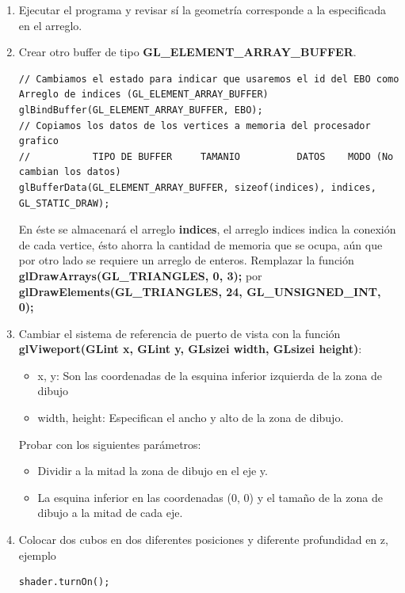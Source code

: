 \documentclass[11pt, english]{article}
\begin{document}
\begin{enumerate}
\item Ejecutar el programa y revisar sí la geometría corresponde a la especificada en el arreglo.

\item Crear otro buffer de tipo \textbf{GL\_ELEMENT\_ARRAY\_BUFFER}.
\begin{lstlisting}[label={list:second},caption={Ejemplo para crear un arreglo de indices.}, style=customc]
// Cambiamos el estado para indicar que usaremos el id del EBO como Arreglo de indices (GL_ELEMENT_ARRAY_BUFFER)
glBindBuffer(GL_ELEMENT_ARRAY_BUFFER, EBO);
// Copiamos los datos de los vertices a memoria del procesador grafico
//           TIPO DE BUFFER     TAMANIO          DATOS    MODO (No cambian los datos)
glBufferData(GL_ELEMENT_ARRAY_BUFFER, sizeof(indices), indices, GL_STATIC_DRAW);
\end{lstlisting}

 En éste se almacenará el arreglo \textbf{indices}, el arreglo indices indica la conexión de cada vertice, ésto ahorra la cantidad de memoria que se ocupa, aún que por otro lado se requiere un arreglo de enteros. Remplazar la función \textbf{glDrawArrays(GL\_TRIANGLES, 0, 3);} por \textbf{glDrawElements(GL\_TRIANGLES, 24, GL\_UNSIGNED\_INT, 0);}

\item Cambiar el sistema de referencia de puerto de vista con la función \textbf{glViweport(GLint x, GLint y, GLsizei width, GLsizei height)}:
\begin{itemize}
\item x, y: Son las coordenadas de la esquina inferior izquierda de la zona de dibujo
\item width, height: Especifican el ancho y alto de la zona de dibujo.
\end{itemize}

Probar con los siguientes parámetros:

\begin{itemize}
\item Dividir a la mitad la zona de dibujo en el eje y.
\item La esquina inferior en las coordenadas (0, 0) y el tamaño de la zona de dibujo a la mitad de cada eje.
\end{itemize}

\item Colocar dos cubos en dos diferentes posiciones y diferente profundidad en z, ejemplo 

\begin{lstlisting}[label={list:third},caption={Ejemplo para colocar dos cubos.}, style=customc]
shader.turnOn();


\end{lstlisting}
\end{enumerate}
\end{document}
